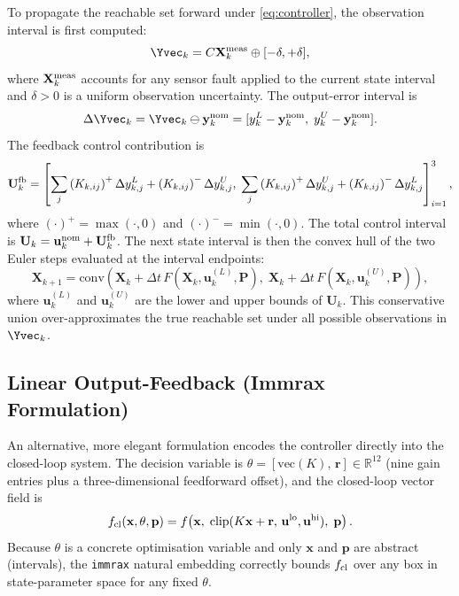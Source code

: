 \documentclass[11pt]{article}
\newcommand{\xvec}{\mathbf{x}}
\newcommand{\uvec}{\mathbf{u}}
\newcommand{\pvec}{\mathbf{p}}
\newcommand{\yvec}{\mathbf{y}}
\newcommand{\Xivl}{\mathbf{X}}
\newcommand{\Pivl}{\mathbf{P}}
\newcommand{\R}{\mathbb{R}}
\begin{document}
To propagate the reachable set forward under \eqref{eq:controller}, the
observation interval is first computed:
\[
  \Yvec_k = C\Xivl_k^{\rm meas} \oplus [-\delta, +\delta],
\]
where $\Xivl_k^{\rm meas}$ accounts for any sensor fault applied to the current
state interval and $\delta > 0$ is a uniform observation uncertainty. The
output-error interval is
\[
  \Delta\Yvec_k = \Yvec_k \ominus \yvec_k^{\rm nom}
  = [y^L_k - \yvec_k^{\rm nom},\; y^U_k - \yvec_k^{\rm nom}].
\]
The feedback control contribution is
\[
  \mathbf{U}_k^{\rm fb} =
  \left[
    \sum_j \left(K_{k,ij}\right)^+ \Delta y^L_{k,j}
    + \left(K_{k,ij}\right)^- \Delta y^U_{k,j},\;
    \sum_j \left(K_{k,ij}\right)^+ \Delta y^U_{k,j}
    + \left(K_{k,ij}\right)^- \Delta y^L_{k,j}
  \right]_{i=1}^{3},
\]
where $(\cdot)^+ = \max(\cdot,0)$ and $(\cdot)^- = \min(\cdot,0)$.
The total control interval is
$\mathbf{U}_k = \uvec_k^{\rm nom} + \mathbf{U}_k^{\rm fb}$.
The next state interval is then the convex hull of the two Euler steps
evaluated at the interval endpoints:
\begin{equation}
  \Xivl_{k+1} = \mathrm{conv}\!\left(
    \Xivl_k + \Delta t\,F(\Xivl_k,\uvec_k^{(L)},\Pivl),\;
    \Xivl_k + \Delta t\,F(\Xivl_k,\uvec_k^{(U)},\Pivl)
  \right),
\end{equation}
where $\uvec_k^{(L)}$ and $\uvec_k^{(U)}$ are the lower and upper bounds of
$\mathbf{U}_k$. This conservative union over-approximates the true reachable
set under all possible observations in $\Yvec_k$.

\subsection{Linear Output-Feedback (Immrax Formulation)}

An alternative, more elegant formulation encodes the controller directly into
the closed-loop system. The decision variable is $\theta = [\mathrm{vec}(K),\,
\mathbf{r}] \in \R^{12}$ (nine gain entries plus a three-dimensional
feedforward offset), and the closed-loop vector field is
\[
  f_{\rm cl}(\xvec, \theta, \pvec)
  = f\!\left(\xvec,\; \mathrm{clip}(K\xvec + \mathbf{r},\, \uvec^{\rm lo},
    \uvec^{\rm hi}),\; \pvec\right).
\]
Because $\theta$ is a concrete optimisation variable and only $\xvec$ and
$\pvec$ are abstract (intervals), the \texttt{immrax} natural embedding
correctly bounds $f_{\rm cl}$ over any box in state-parameter space for any
fixed $\theta$.

\end{document}
